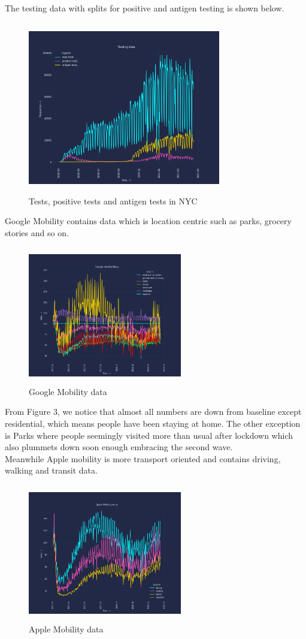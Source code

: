 \documentclass[12pt,a4paper]{article}
\begin{document}
The testing data with splits for positive and antigen testing is shown below.
\begin{figure}[H]
    \centering
    \includegraphics[width=0.75\textwidth,height=75mm]{images/tests.png}
    \caption{Tests, positive tests and antigen tests in NYC}
\end{figure}
Google Mobility contains data which is location
centric such as parks, grocery stories and so on. 
\begin{figure}[H]
    \centering
    \includegraphics[width=0.6\textwidth,height=60mm]{images/google.png}
    \caption{Google Mobility data}
\end{figure}
From Figure 3, we notice that almost all numbers are down from baseline
except residential, which means people have been staying at home. The other 
exception is Parks where people seemingly visited more than usual after 
lockdown which also plummets down soon enough embracing the second wave.
\\
Meanwhile Apple mobility is more transport oriented and contains driving, walking and transit data.
\begin{figure}[H]
    \centering
    \includegraphics[width=0.6\textwidth,height=60mm]{images/apple.png}
    \caption{Apple Mobility data}
\end{figure}
\end{document}
